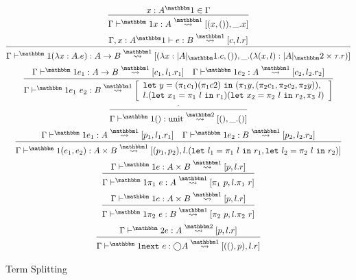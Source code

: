 \documentclass[11pt]{article}
\newcommand {\fut} {\bigcirc}
\newcommand {\bbone} {\mathbbm 1}
\newcommand {\bbtwo} {\mathbbm 2}
\newcommand {\pause} {{\tt save}}
\newcommand {\next} {{\tt next}}
\newcommand {\prev} {{\tt prev}}
\newcommand {\gdo} {{\Gamma \vdash^\bbone}}
\newcommand {\gdt} {{\Gamma \vdash^\bbtwo}}
\newcommand {\letin} [3] {{\tt let}~{#1} = {#2}~{\tt in}~{#3}}
\newcommand {\splito} {\overset{\bbone}\rightsquigarrow}
\newcommand {\splits} {\overset{\bbtwo}\rightsquigarrow}
\newcommand {\inferenceSpacing}{\setlength{\jot}{1.8ex}}
\begin{document}
\begin{figure*}
\caption{Term Splitting}
\label{fig:splitting}
\inferenceSpacing
\begin{gather}
\infer {\gdo x : A\splito [(x,()),\_.x]}{x : A^\bbone \in \Gamma} \\
\infer {\gdo (\lambda x:A.e) : A \to B \splito [(\lambda x:|A|_\bbone.c,()),\_.(\lambda (x,l):|A|_\bbtwo\times \tau.r)]}
	{\Gamma,x:A^\bbone \vdash e : B \splito [c,l.r]} \\
\infer {\gdo e_1~e_2 : B \splito 
	\left[ \begin{array}{l}\letin{y}{(\pi_1 c_1) (\pi_1 c2)}{(\pi_1 y,(\pi_2 c_1,\pi_2 c_2, \pi_2 y))}, \\
	l.(\letin{x_1}{\pi_1~l}{r_1})(\letin{x_2}{\pi_2~l}{r_2},\pi_3~l) \end{array} \right ] }
	{\gdo e_1 : A \to B \splito [c_1,l_1.r_1] 
	& \gdo e_2 : A \splito [c_2,l_2.r_2]} \\
\infer {\gdo () : \text{unit} \splits [(),\_.()]}{\cdot} \\
\infer {\gdo (e_1,e_2) : A\times B \splito [(p_1,p_2), l.(\letin{l_1}{\pi_1~l}{r_1},\letin{l_2}{\pi_2~l}{r_2})] }
	{ \gdo e_1 : A \splito [p_1,l_1.r_1] 
	&\gdo e_2 : B \splito [p_2,l_2.r_2]} \\
\infer {\gdo \pi_1~e : A \splito [\pi_1~p,l.\pi_1~r] }{\gdo e : A\times B \splito [p,l.r] } \\
\infer {\gdo \pi_2~e : B \splito [\pi_2~p,l.\pi_2~r] }{\gdo e : A\times B \splito [p,l.r]} \\
\infer {\gdo \next~e : \fut A \splito [((),p),l.r]}{\gdt e : A\splits [p,l.r] } 
\end{gather}
\end{figure*}
\end{document}
